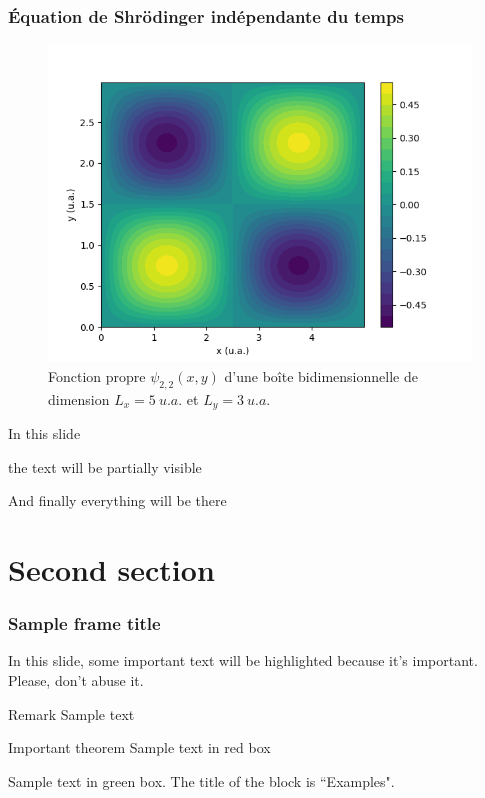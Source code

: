 \documentclass{beamer}
\begin{document}
\begin{frame}
\frametitle{Équation de Shrödinger indépendante du temps}
\begin{figure}[h]
\includegraphics[scale=0.5]{fct_propre2d_22}
\caption{Fonction propre $\psi_{2,2}(x,y)$ d'une boîte bidimensionnelle de dimension $L_x=5\ u.a.$ et $L_y=3\ u.a.$}
\end{figure}
\end{frame}


\begin{frame}
In this slide \pause

the text will be partially visible \pause

And finally everything will be there
\end{frame}

\section{Second section}

\begin{frame}
\frametitle{Sample frame title}

In this slide, some important text will be
\alert{highlighted} because it's important.
Please, don't abuse it.

\begin{block}{Remark}
Sample text
\end{block}

\begin{alertblock}{Important theorem}
Sample text in red box
\end{alertblock}

\begin{examples}
Sample text in green box. The title of the block is ``Examples".
\end{examples}
\end{frame}
\end{document}
